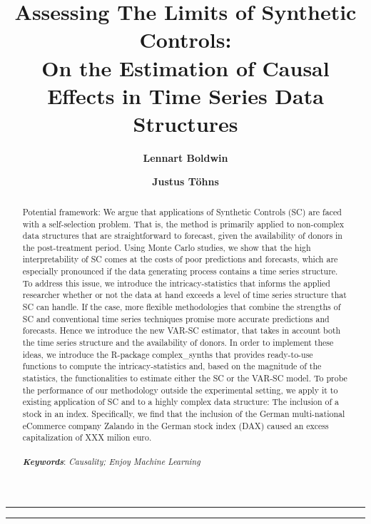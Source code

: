 \documentclass{article}
\author[1]{\textbf{Lennart Boldwin}}
\author[2]{\textbf{Justus Töhns}}
\affil[1,2]{ University of Cologne, Chair of Statistics and Econometrics \newline
	Supervised by Prof. Jörg Breitung
}
\title{\textbf{\huge Assessing The Limits of Synthetic Controls:}\\
	On the Estimation of Causal Effects in Time Series Data Structures}
\date{}
\begin{document}
	\onehalfspacing
	\pagestyle{headings}	
	\newpage
	\setcounter{page}{1}
	\renewcommand{\thepage}{\arabic{page}}
	
	
	
		
	\setlength{\parskip}{0.5em}
	
	\maketitle
	
	\noindent\rule{15cm}{0.5pt}
	\begin{abstract}
		Potential framework: We argue that applications of Synthetic Controls (SC) are faced with a self-selection problem. That is, the method is primarily applied to non-complex data structures that are straightforward to forecast, given the availability of donors in the post-treatment period. Using Monte Carlo studies, we show that the high interpretability of SC comes at the costs of poor predictions and forecasts, which are especially pronounced if the data generating process contains a time series structure. To address this issue, we introduce the intricacy-statistics that informs the applied researcher whether or not the data at hand exceeds a level of time series structure that SC can handle. If the case, more flexible methodologies that combine the strengths of SC and conventional time series techniques promise more accurate predictions and forecasts. Hence we introduce the new VAR-SC estimator, that takes in account both the time series structure and the availability of donors. In order to implement these ideas, we introduce the R-package complex\_synths that provides ready-to-use functions to compute the intricacy-statistics and, based on the magnitude of the statistics, the functionalities to estimate either the SC or the VAR-SC model. To probe the performance of our methodology outside the experimental setting, we apply it to existing application of SC and to a highly complex data structure: The inclusion of a stock in an index. Specifically, we find that the inclusion of the German multi-national eCommerce company Zalando in the German stock index (DAX) caused an excess capitalization of XXX milion euro.  \\ \\
		
		\textbf{\textit{Keywords}}: \textit{Causality; Enjoy Machine Learning}
	\end{abstract}
	\noindent\rule{15cm}{0.4pt}
	
	
	\newpage
	
	\newpage
	
	\newpage	
	
	\newpage
	
	\newpage	
	
	\newpage
	
	\newpage
	
	

	\newpage
	 
	
	
\end{document}
